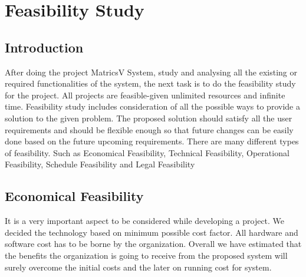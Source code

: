 \chapter{Feasibility Study}


\section{Introduction}


After doing the project MatricsV System, study and analysing all the existing or required functionalities of the system, the next task is to do the feasibility study for the project. All projects are feasible-given unlimited resources and infinite time. Feasibility study includes consideration of all the possible ways to provide a solution to the given problem. The proposed solution should satisfy all the user requirements and should be flexible enough so that future changes can be easily done based on the future upcoming requirements. There are many different types of feasibility. Such as Economical Feasibility, Technical Feasibility, Operational Feasibility, Schedule Feasibility and Legal Feasibility





\section{Economical Feasibility}

It is a very important aspect to be considered while developing a project. We decided the technology based on minimum possible cost factor. All hardware and software cost has to be borne by the organization. Overall we have estimated that the benefits the organization is going to receive from the proposed system will surely overcome the initial costs and the later on running cost for system.


